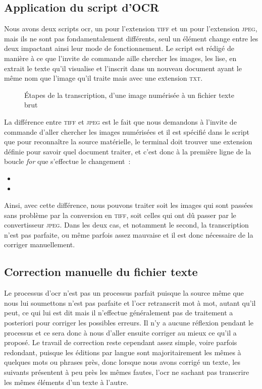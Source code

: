 \subsection{Application du script d'OCR}
Nous avons deux scripts \acrshort{ocr}, un pour l'extension \textsc{tiff} et un pour l'extension \textsc{jpeg}, mais ils ne sont pas fondamentalement différents, seul un élément change entre les deux impactant ainsi leur mode de fonctionnement. Le script est rédigé de manière à ce que l'invite de commande aille chercher les images, les lise, en extrait le texte qu'il visualise et l'inscrit dans un nouveau document ayant le même nom que l'image qu'il traite mais avec une extension \textsc{txt}.
\begin{figure}[t]
    \centering
    \caption{Étapes de la transcription, d'une image numérisée à un fichier texte brut}
    \label{fig:OCR}
\end{figure}
La différence entre \textsc{tiff} et \textsc{jpeg} est le fait que nous demandons à l'invite de commande d'aller chercher les images numérisées et il est spécifié dans le script que pour reconnaître la source matérielle, le terminal doit trouver une extension définie pour savoir quel document traiter, et c'est donc à la première ligne de la boucle \textit{for} que s'effectue le changement~:
\begin{itemize}
    \item {}
    \item {}
\end{itemize}
Ainsi, avec cette différence, nous pouvons traiter soit les images qui sont passées sans problème par la conversion en \textsc{tiff}, soit celles qui ont dû passer par le convertisseur \textsc{jpeg}. Dans les deux cas, et notamment le second, la transcription n'est pas parfaite, ou même parfois assez mauvaise et il est donc nécessaire de la corriger manuellement.

\subsection{Correction manuelle du fichier texte}
Le processus d'\acrshort{ocr} n'est pas un processus parfait puisque la source même que nous lui soumettons n'est pas parfaite et l'\acrshort{ocr} retranscrit mot à mot, autant qu'il peut, ce qui lui est dit mais il n'effectue généralement pas de traitement a posteriori pour corriger les possibles erreurs. Il n'y a aucune réflexion pendant le processus et ce sera donc à nous d'aller ensuite corriger au mieux ce qu'il a proposé. Le travail de correction reste cependant assez simple, voire parfois redondant, puisque les éditions par langue sont majoritairement les mêmes à quelques mots ou phrases près, donc lorsque nous avons corrigé un texte, les suivants présentent à peu près les mêmes fautes, l'\acrshort{ocr} ne sachant pas transcrire les mêmes éléments d'un texte à l'autre.


